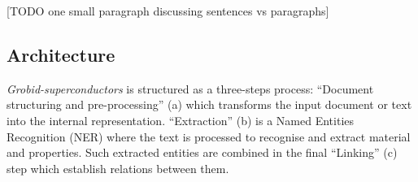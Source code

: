 \documentclass{article}
\begin{document}
[TODO one small paragraph discussing sentences vs paragraphs]




\subsection{Architecture}

\textit{Grobid-superconductors} is structured as a three-steps process: ``Document structuring and pre-processing'' (a) which transforms the input document or text into the internal representation. ``Extraction'' (b) is a Named Entities Recognition (NER) where the text is processed to recognise and extract material and properties. Such extracted entities are combined in the final ``Linking'' (c) step which establish relations between them. 
\end{document}
